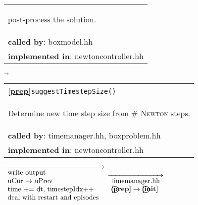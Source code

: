\begin{landscape}
{\begin{tabular}{|l|}
      \begin{scriptsize}post-process the solution.\end{scriptsize}\\      
      \textbf{called by}: boxmodel.hh\\
      \textbf{implemented in}: newtoncontroller.hh\\  
	\hline 
    \end{tabular}
\nextline
    {\scriptsize$\overrightarrow{}$}
    \begin{tabular}{|l|}
      \hline
      \textbf{\textcircled{\ref{prep}}}\verb+suggestTimestepSize()+ \\
      \begin{scriptsize}Determine new time step size from \# \textsc{Newton} steps. \end{scriptsize}\\      
      \textbf{called by}: timemanager.hh, boxproblem.hh\\
      \textbf{implemented in}: newtoncontroller.hh\\  
	\hline 
    \end{tabular}
    {\scriptsize$\overrightarrow
				  {\begin{array}{l}
				  \textnormal{write output}\\
				  \textnormal{uCur $\rightarrow$ uPrev}\\
				  \textnormal{time += dt, timestepIdx++}\\
				  \textnormal{deal with restart and episodes }\\
                                \end{array}}
    $}
    {\scriptsize$\overrightarrow{
    \begin{array}{l}
    \textnormal{timemanager.hh}\\
    \textbf{\textcircled{\ref{prep}}} \rightarrow \textbf{\textcircled{\ref{init}}}
    \end{array}
    }$}
}

\end{landscape}
\normalsize

\newpage 
\pagestyle{scrheadings}

